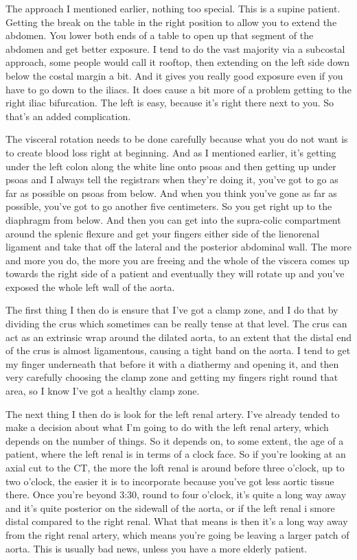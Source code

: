 \documentclass[
]{book}
\begin{document}
The approach I mentioned earlier, nothing too special. This is a supine
patient. Getting the break on the table in the right position to allow
you to extend the abdomen. You lower both ends of a table to open up
that segment of the abdomen and get better exposure. I tend to do the
vast majority via a subcostal approach, some people would call it
rooftop, then extending on the left side down below the costal margin a
bit. And it gives you really good exposure even if you have to go down
to the iliacs. It does cause a bit more of a problem getting to the
right iliac bifurcation. The left is easy, because it's right there next
to you. So that's an added complication.

The visceral rotation needs to be done carefully because what you do not
want is to create blood loss right at beginning. And as I mentioned
earlier, it's getting under the left colon along the white line onto
psoas and then getting up under psoas and I always tell the registrars
when they're doing it, you've got to go as far as possible on psoas from
below. And when you think you've gone as far as possible, you've got to
go another five centimeters. So you get right up to the diaphragm from
below. And then you can get into the supra-colic compartment around the
splenic flexure and get your fingers either side of the lienorenal
ligament and take that off the lateral and the posterior abdominal wall.
The more and more you do, the more you are freeing and the whole of the
viscera comes up towards the right side of a patient and eventually they
will rotate up and you've exposed the whole left wall of the aorta.

The first thing I then do is ensure that I've got a clamp zone, and I do
that by dividing the crus which sometimes can be really tense at that
level. The crus can act as an extrinsic wrap around the dilated aorta,
to an extent that the distal end of the crus is almost ligamentous,
causing a tight band on the aorta. I tend to get my finger underneath
that before it with a diathermy and opening it, and then very carefully
choosing the clamp zone and getting my fingers right round that area, so
I know I've got a healthy clamp zone.

The next thing I then do is look for the left renal artery. I've already
tended to make a decision about what I'm going to do with the left renal
artery, which depends on the number of things. So it depends on, to some
extent, the age of a patient, where the left renal is in terms of a
clock face. So if you're looking at an axial cut to the CT, the more the
loft renal is around before three o'clock, up to two o'clock, the easier
it is to incorporate because you've got less aortic tissue there. Once
you're beyond 3:30, round to four o'clock, it's quite a long way away
and it's quite posterior on the sidewall of the aorta, or if the left
renal i smore distal compared to the right renal. What that means is
then it's a long way away from the right renal artery, which means
you're going be leaving a larger patch of aorta. This is usually bad
news, unless you have a more elderly patient.
\end{document}
